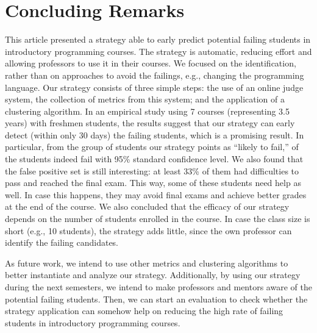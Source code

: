 \section{Concluding Remarks}

\label{sec:conclusion}

This article presented a strategy able to early predict potential failing students in introductory programming courses. The strategy is automatic, reducing effort and allowing professors to use it in their courses. We focused on the identification, rather than on approaches to avoid the failings, e.g., changing the programming language. Our strategy consists of three simple steps: the use of an online judge system, the collection of metrics from this system; and the application of a clustering algorithm. In an empirical study using 7 courses (representing 3.5 years) with freshmen students, the results suggest that our strategy can early detect (within only 30 days) the failing students, which is a promising result. In particular, from the group of students our strategy points as ``likely to fail,'' \higherPrecision of the students indeed fail with 95\% standard confidence level. We also found that the false positive set is still interesting: at least 33\% of them had difficulties to pass and reached the final exam. This way, some of these students need help as well. In case this happens, they may avoid final exams and achieve better grades at the end of the course. We also concluded that the efficacy of our strategy depends on the number of students enrolled in the course. In case the class size is short (e.g., 10 students), the strategy adds little, since the own professor can identify the failing candidates.

As future work, we intend to use other metrics and clustering algorithms to better instantiate and analyze our strategy. Additionally, by using our strategy during the next semesters, we intend to make professors and mentors aware of the potential failing students. Then, we can start an evaluation to check whether the strategy application can somehow help on reducing the high rate of failing students in introductory programming courses.